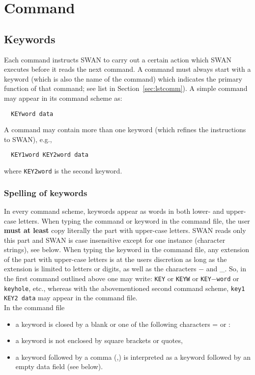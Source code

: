 \documentclass[12pt]{book}
\begin{document}
\section{Command}

\subsection{Keywords}

Each command instructs SWAN to carry out a certain action which SWAN executes before it reads the next command.
A command must always start with a keyword (which is also the name of the command) which indicates the primary
function of that command; see list in Section~\ref{sec:lstcomm}). A simple command may appear in its command
scheme as:
\begin{verbatim}
  KEYword data
\end{verbatim}
A command may contain more than one keyword (which refines the instructions to SWAN), e.g.,
\begin{verbatim}
  KEY1word KEY2word data
\end{verbatim}
where {\tt KEY2word} is the second keyword.

\subsubsection{Spelling of keywords}

In every command scheme, keywords appear as words in both lower- and upper-case letters. When typing the command or
keyword in the command file, the user {\bf must at least} copy literally the part with upper-case letters. SWAN reads
only this part and SWAN is case insensitive except for one instance (character strings), see below. When typing the
keyword in the command file, any extension of the part with upper-case letters is at the users discretion as long as
the extension is limited to letters or digits, as well as the characters $-$ and \_. So, in the first command outlined
above one may write: {\tt KEY} or {\tt KEYW} or {\tt KEY}$-${\tt word} or {\tt keyhole}, etc., whereas with the
abovementioned second command scheme, {\tt key1 KEY2 data} may appear in the command file.
\\[2ex]
\noindent
In the command file
\begin{itemize}
  \item a keyword is closed by a blank or one of the following characters = or :
  \item a keyword is not enclosed by square brackets or quotes,
  \item a keyword followed by a comma (,) is interpreted as a keyword followed by an empty data field (see below).
\end{itemize}
\end{document}
